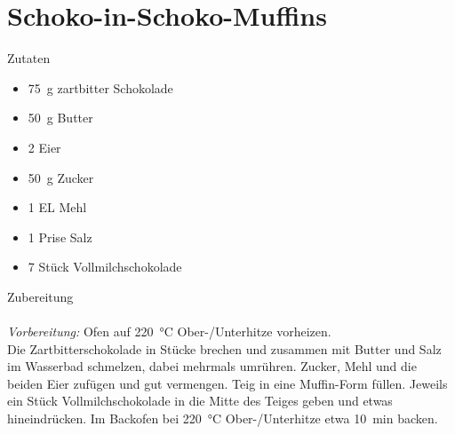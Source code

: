 \section*{Schoko-in-Schoko-Muffins}
\ihead{}\ohead{}
\cfoot{}
{\Large Zutaten}
\begin{multicols}{2}
\begin{itemize}
    \item \SI{75}{g} zartbitter Schokolade
    \item \SI{50}{g} Butter
    \item \num{2} Eier
    \item \SI{50}{g} Zucker
    \item \num{1} EL Mehl
    \item \num{1} Prise Salz
    \item \num{7} Stück Vollmilchschokolade
\end{itemize}
\end{multicols}
\noindent
{\Large Zubereitung}\\
\\
\textit{Vorbereitung:} Ofen auf \SI{220}{\celsius} Ober-/Unterhitze vorheizen.\\
Die Zartbitterschokolade in Stücke brechen und zusammen mit Butter und Salz im Wasserbad schmelzen, dabei mehrmals umrühren.
Zucker, Mehl und die beiden Eier zufügen und gut vermengen.
Teig in eine Muffin-Form füllen. 
Jeweils ein Stück Vollmilchschokolade in die Mitte des Teiges geben und etwas hineindrücken.
Im Backofen bei \SI{220}{\celsius} Ober-/Unterhitze etwa \SI{10}{min} backen.